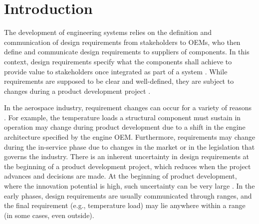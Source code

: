 \chapter{Introduction}
\label{ch:intro}

The development of engineering systems relies on the definition and communication of design requirements from stakeholders to \acp{OEM}, who then define and communicate design requirements to suppliers of components. In this context, design requirements specify what the components shall achieve to provide value to stakeholders once integrated as part of a system \cite{Blanchard1981}. While requirements are supposed to be clear and well-defined, they are subject to changes during a product development project \cite{Peterson2007}. 

In the aerospace industry, requirement changes can occur for a variety of reasons \cite{Boeing2013,Eckert2004}. For example, the temperature loads a structural component must sustain in operation may change during product development due to a shift in the engine architecture specified by the engine \ac{OEM}. Furthermore, requirements may change during the in-service phase due to changes in the market or in the legislation that governs the industry. There is an inherent uncertainty in design requirements at the beginning of a product development project, which reduces when the project advances and decisions are made. At the beginning of product development, where the innovation potential is high, such uncertainty can be very large \cite{ullman2009mechanical}. In the early phases, design requirements are usually communicated through ranges, and the final requirement (e.g., temperature load) may lie anywhere within a range (in some cases, even outside). 

